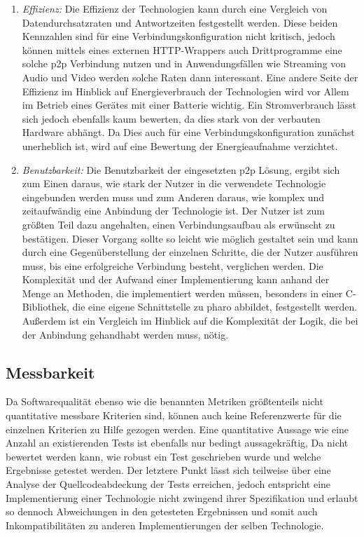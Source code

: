 \begin{enumerate}
    	\item {\it Effizienz:}
    	Die Effizienz der Technologien kann durch eine Vergleich von Datendurchsatzraten und Antwortzeiten festgestellt werden. Diese beiden Kennzahlen sind für eine Verbindungskonfiguration nicht kritisch, jedoch können mittels eines externen HTTP-Wrappers auch Drittprogramme eine solche p2p Verbindung nutzen und in Anwendungsfällen wie Streaming von Audio und Video werden solche Raten dann interessant. Eine andere Seite der Effizienz im Hinblick auf Energieverbrauch der Technologien wird vor Allem im Betrieb eines Gerätes mit einer Batterie wichtig. Ein Stromverbrauch lässt sich jedoch ebenfalls kaum bewerten, da dies stark von der verbauten Hardware abhängt. Da Dies auch für eine Verbindungskonfiguration zunächst unerheblich ist, wird auf eine Bewertung der Energieaufnahme verzichtet.
    	\item {\it Benutzbarkeit:}
    	Die Benutzbarkeit der eingesetzten p2p Lösung, ergibt sich zum Einen daraus, wie stark der Nutzer in die verwendete Technologie eingebunden werden muss und zum Anderen daraus, wie komplex und zeitaufwändig eine Anbindung der Technologie ist.
    	Der Nutzer ist zum größten Teil dazu angehalten, einen Verbindungsaufbau als erwünscht zu bestätigen. Dieser Vorgang sollte so leicht wie möglich gestaltet sein und kann durch eine \linebreak Gegenüberstellung der einzelnen Schritte, die der Nutzer ausführen muss, bis eine erfolgreiche Verbindung besteht, verglichen werden.
    	Die Komplexität und der Aufwand einer Implementierung kann anhand der Menge an Methoden, die implementiert werden müssen, besonders in einer C-Bibliothek, die eine eigene \linebreak Schnittstelle zu pharo abbildet, festgestellt werden. Außerdem ist ein Vergleich im Hinblick auf die Komplexität der Logik, die bei der Anbindung gehandhabt werden muss, nötig.
    	\end{enumerate}
	    	\pagebreak
    		\subsection{Messbarkeit}
		Da Softwarequalität ebenso wie die benannten Metriken größtenteils nicht quantitative messbare Kriterien sind, können auch keine Referenzwerte für die einzelnen Kriterien zu Hilfe gezogen werden. Eine quantitative Aussage wie eine Anzahl an existierenden Tests ist ebenfalls nur bedingt aussagekräftig, Da nicht bewertet werden kann, wie robust ein Test geschrieben wurde und welche Ergebnisse getestet werden. Der letztere Punkt lässt sich teilweise über eine Analyse der Quellcodeabdeckung der Tests erreichen, jedoch entspricht eine Implementierung einer Technologie nicht zwingend ihrer Spezifikation und erlaubt so dennoch Abweichungen in den getesteten Ergebnissen und somit auch Inkompatibilitäten zu anderen Implementierungen der selben Technologie.
		
